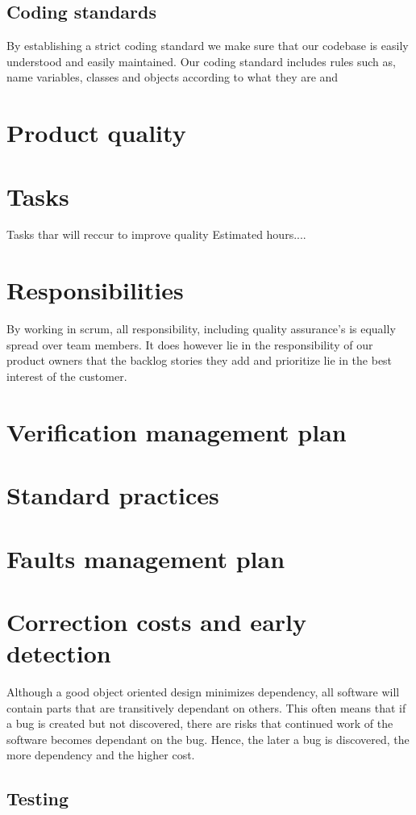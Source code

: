 \documentclass{article}
\begin{document}
\subsection{Coding standards}
By establishing a strict coding standard we make sure that our codebase is easily understood and easily maintained.
Our coding standard includes rules such as, name variables, classes and objects according to what they are and 


\section{Product quality}

\section{Tasks}
Tasks thar will reccur to improve quality
Estimated hours....
\section{Responsibilities}
By working in scrum, all responsibility, including quality assurance's is equally spread over team members.
It does however lie in the responsibility of our product owners that the backlog stories they add and prioritize lie in the best interest of the customer.
\section{Verification management plan}
\section{Standard practices}
\section{Faults management plan}
\section{Correction costs and early detection}
Although a good object oriented design minimizes dependency, all software will contain parts that are transitively dependant on others. This often means that if a bug is created but not discovered, there are risks that continued work of the software becomes dependant on the bug. Hence, the later a bug is discovered, the more dependency and the higher cost.

\subsection{Testing}
\end{document}
